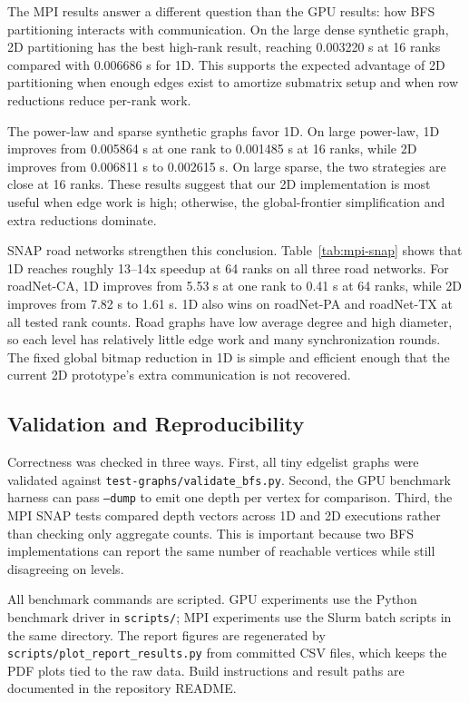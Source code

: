 \documentclass[11pt]{article}
\begin{document}
The MPI results answer a different question than the GPU results: how BFS
partitioning interacts with communication. On the large dense synthetic graph,
2D partitioning has the best high-rank result, reaching 0.003220 s at 16 ranks
compared with 0.006686 s for 1D. This supports the expected advantage of 2D
partitioning when enough edges exist to amortize submatrix setup and when row
reductions reduce per-rank work.

The power-law and sparse synthetic graphs favor 1D. On large power-law, 1D
improves from 0.005864 s at one rank to 0.001485 s at 16 ranks, while 2D
improves from 0.006811 s to 0.002615 s. On large sparse, the two strategies are
close at 16 ranks. These results suggest that our 2D implementation is most
useful when edge work is high; otherwise, the global-frontier simplification
and extra reductions dominate.

SNAP road networks strengthen this conclusion. Table~\ref{tab:mpi-snap} shows
that 1D reaches roughly 13--14x speedup at 64 ranks on all three road networks.
For roadNet-CA, 1D improves from 5.53 s at one rank to 0.41 s at 64 ranks,
while 2D improves from 7.82 s to 1.61 s. 1D also wins on roadNet-PA and
roadNet-TX at all tested rank counts.
Road graphs have low average degree and high diameter, so each level has
relatively little edge work and many synchronization rounds. The fixed global
bitmap reduction in 1D is simple and efficient enough that the current 2D
prototype's extra communication is not recovered.

\FloatBarrier
\subsection{Validation and Reproducibility}

Correctness was checked in three ways. First, all tiny edgelist graphs were
validated against \texttt{test-graphs/validate\_bfs.py}. Second, the GPU
benchmark harness can pass \texttt{--dump} to emit one depth per vertex for
comparison. Third, the MPI SNAP tests compared depth vectors across 1D and 2D
executions rather than checking only aggregate counts. This is important
because two BFS implementations can report the same number of reachable
vertices while still disagreeing on levels.

All benchmark commands are scripted. GPU experiments use the Python benchmark
driver in \texttt{scripts/}; MPI experiments use the Slurm batch scripts in the
same directory. The report figures are regenerated by
\texttt{scripts/plot\_report\_results.py} from committed CSV files, which keeps
the PDF plots tied to the raw data. Build instructions and result paths are
documented in the repository README.
\end{document}
